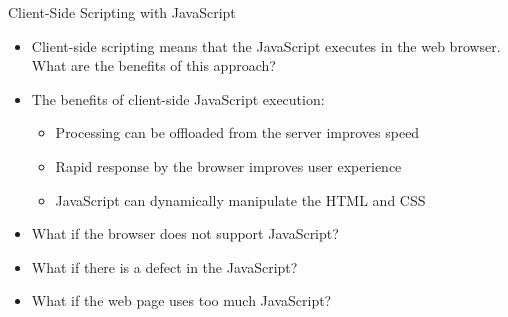 \documentclass[14pt,aspectratio=169]{beamer}
\begin{document}
%
\begin{frame}{Client-Side Scripting with JavaScript}
  \begin{itemize}
    \item Client-side scripting means that the JavaScript executes in the web
      browser. What are the benefits of this approach?
      \vspace*{-.15in}
    \item The benefits of client-side JavaScript execution:
      \begin{itemize}
        \item Processing can be offloaded from the server improves speed
        \item Rapid response by the browser improves user experience
        \item JavaScript can dynamically manipulate the HTML and CSS
      \end{itemize}
      \vspace*{-.2in}
    \item What if the browser does not support JavaScript?
      \vspace*{-.2in}
    \item What if there is a defect in the JavaScript?
      \vspace*{-.2in}
    \item What if the web page uses too much JavaScript?
  \end{itemize}
\end{frame}
\end{document}
